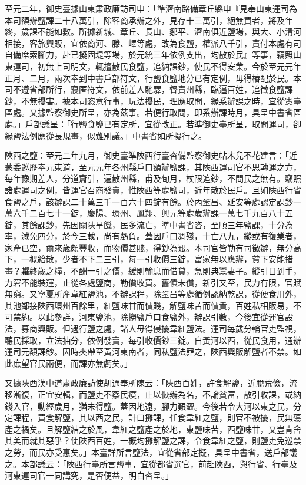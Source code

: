 \begin{pinyinscope}
 至元二年，御史臺據山東肅政廉訪司申：「準濟南路備章丘縣申『見奉山東運司為本司額辦鹽課二十八萬引，除客商承辦之外，見存十三萬引，絕無買者，將及年終，歲課不能如數。所據新城、章丘、長山、鄒平、濟南俱近鹽場，與大、小清河相接，客旅興販，宜依商河、滕、嶧等處，改為食鹽，權派八千引，責付本處有司自備席索腳力，赴已擬固堤等場，於元統三年依例支出，均散於民』等事，竊照山東運司，初無上司明文，輒擅散民食鹽，追納課鈔，使民不得安業。今於至元元年正月、二月，兩次奉到中書戶部符文，行鹽食鹽地分已有定例，毋得樁配於民。本司不遵省部所行，寢匿符文，依前差人馳驛，督責州縣，臨逼百姓，追徵食鹽課鈔，不無擾害。據本司恣意行事，玩法擾民，理應取問，緣系辦課之時，宜從憲臺區處。又據監察御史所呈，亦為茲事。若便行取問，即系辦課時月，具呈中書省區處。」戶部議呈：「行鹽食鹽已有定所，宜從改正。若準御史臺所呈，取問運司，卻緣鹽法例應從長規畫，似難別議。」中書省如所擬行之。



 陜西之鹽：至元二年九月，御史臺準陜西行臺咨備監察御史帖木兒不花建言：「近蒙委巡歷奉元東道，至元元年各州縣戶口額辦鹽課，其陜西運司官不思轉運之方，每年豫期差人，分道齎引，遍散州縣，甫及旬月，杖限追鈔，不問民之無有。竊照諸處運司之例，皆運官召商發賣，惟陜西等處鹽司，近年散於民戶。且如陜西行省食鹽之戶，該辦課二十萬三千一百六十四錠有餘。於內鞏昌、延安等處認定課鈔一萬六千二百七十一錠，慶陽、環州、鳳翔、興元等處歲辦課一萬七千九百八十五錠，其餘課鈔，先因關陜旱饑，民多流亡，準中書省咨，至順三年鹽課，十分為率，減免四分，於今三載，尚有虧負。蓋因戶口凋殘，十亡八九，縱或有復業者，家產已空，爾來歲頗豐收，而物價甚賤，得鈔為艱。本司官皆勒有司徵辦，無分高下，一概給散，少者不下二三引，每一引收價三錠，富家無以應辦，貧下安能措畫？糶終歲之糧，不酬一引之價，緩則輸息而借貸，急則典鬻妻子。縱引目到手，力窘不能裝運，止從各處鹽商，勒價收買。舊債未償，新引又至，民力有限，官賦無窮。又寧夏所產韋紅鹽池，不辦課程，除鞏昌等處循例認納乾課，從便食用外，其池鄰接陜西環州百餘里，紅鹽味甘而價賤，解鹽味苦而價貴，百姓私相販易，不可禁約。以此參詳，河東鹽池，除撈鹽戶口食鹽外，辦課引數，今後宜從運官設法，募商興販。但遇行鹽之處，諸人毋得侵擾韋紅鹽法。運司每歲分輪官吏監視，聽民採取，立法抽分，依例發賣，每引收價鈔三錠。自黃河以西，從民食用，通辦運司元額課鈔。因時夾帶至黃河東南者，同私鹽法罪之，陜西興販解鹽者不禁。如此庶望官民兩便，而課亦無虧矣。」



 又據陜西漢中道肅政廉訪使胡通奉所陳云：「陜西百姓，許食解鹽，近脫荒儉，流移漸復，正宜安輯，而鹽吏不察民瘼，止以恢辦為名，不論貧富，散引收課，或納錢入官，動經歲月，猶未得鹽。蓋因地遠，腳力艱澀。今後若令大河以東之民，分定課程，買食解鹽，其以西之民，計口攤課，任食韋紅之鹽，則官不被擾，民無蕩產之禍矣。且解鹽結之於風，韋紅之鹽產之於地，東鹽味苦，西鹽味甘，又豈肯舍其美而就其惡乎？使陜西百姓，一概均攤解鹽之課，令食韋紅之鹽，則鹽吏免巡禁之勞，而民亦受惠矣。」本臺詳所言鹽法，宜從省部定擬，具呈中書省，送戶部議之。本部議云：「陜西行臺所言鹽事，宜從都省選官，前赴陜西，與行省、行臺及河東運司官一同講究，是否便益，明白咨呈。」




\end{pinyinscope}
